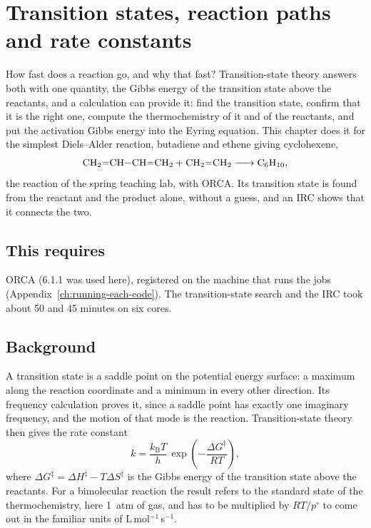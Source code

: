 \chapter{Transition states, reaction paths and rate constants}
\label{ch:reaction-rates}


How fast does a reaction go, and why that fast? Transition-state theory answers both with one quantity, the Gibbs energy of the transition state above the reactants, and a calculation can provide it: find the transition state, confirm that it is the right one, compute the thermochemistry of it and of the reactants, and put the activation Gibbs energy into the Eyring equation. This chapter does it for the simplest Diels--Alder reaction, butadiene and ethene giving cyclohexene,
\begin{equation*}
	\ce{CH2=CH-CH=CH2 + CH2=CH2 -> C6H10},
\end{equation*}
the reaction of the spring teaching lab, with ORCA. Its transition state is found from the reactant and the product alone, without a guess, and an IRC shows that it connects the two.

\section*{This requires}
ORCA (6.1.1 was used here), registered on the machine that runs the jobs (Appendix~\ref{ch:running-each-code}). The transition-state search and the IRC took about 50 and 45 minutes on six cores.

\section{Background}
A transition state is a saddle point on the potential energy surface: a maximum along the reaction coordinate and a minimum in every other direction. Its frequency calculation proves it, since a saddle point has exactly one imaginary frequency, and the motion of that mode is the reaction. Transition-state theory then gives the rate constant
\begin{equation*}
	k = \frac{k_\mathrm{B}T}{h}\,\exp\!\left(-\frac{\Delta G^\ddagger}{RT}\right),
\end{equation*}
where $\Delta G^\ddagger = \Delta H^\ddagger - T\Delta S^\ddagger$ is the Gibbs energy of the transition state above the reactants. For a bimolecular reaction the result refers to the standard state of the thermochemistry, here 1~atm of gas, and has to be multiplied by $RT/p^\circ$ to come out in the familiar units of L\,mol$^{-1}$\,s$^{-1}$.

